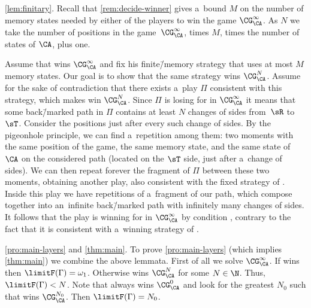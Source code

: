 \begin{proofof}{\cref{lem:finitary}.}
	Recall that \cref{rem:decide-winner} gives a~bound $M$ on the number of memory states needed by either of the players to win the game $\CG^\infty_\CA$.
	As $N$ we take the number of positions in the game~$\CG^\infty_\CA$, times $M$, times the number of states of $\CA$, plus one.
	
	Assume that \adam wins $\CG^\infty_\CA$ and fix his finite\=/memory strategy that uses at most $M$ memory states.
	Our goal is to show that the same strategy wins $\CG^N_\CA$.
	Assume for the sake of contradiction that there exists a~play $\Pi$ consistent with this strategy, which makes \eve win $\CG^N_\CA$.
	Since $\Pi$ is losing for \eve in $\CG^\infty_\CA$ it means that
	some back\=/marked path in $\Pi$ contains at least $N$ changes of sides from~$\sR$ to $\sT$.
	Consider the positions just after every such change of sides.
	By the pigeonhole principle, we can find a~repetition among them:
	two moments with the same position of the game, the same memory state, and the same state of $\CA$ on the considered path
	(located on the $\sT$ side, just after a~change of sides).
	We can then repeat forever the fragment of $\Pi$ between these two moments, obtaining another play, also consistent with the fixed strategy of \adam.
	Inside this play we have repetitions of a~fragment of our path, which compose together into an~infinite back\=/marked path with infinitely many changes of sides.
	It follows that the play is winning for \eve in $\CG^\infty_\CA$ by condition , contrary to the fact that it is consistent with a~winning strategy of \adam.
\end{proofof}

\begin{proofof}{\cref{pro:main-layers} and \cref{thm:main}.}
	To prove \cref{pro:main-layers} (which implies \cref{thm:main}) we combine the above lemmata.
	First of all we solve $\CG^\infty_\CA$.
	If \eve wins then $\limitF(\Gamma)=\omega_1$.
	Otherwise \adam wins $\CG^N_\CA$ for some $N\in\N$.
	Thus, $\limitF(\Gamma)<N$.
	Note that \eve always wins $\CG^0_\CA$ and look for the greatest $N_0$ such that \eve wins $\CG^{N_0}_\CA$. Then $\limitF(\Gamma)=N_0$.
\end{proofof}

